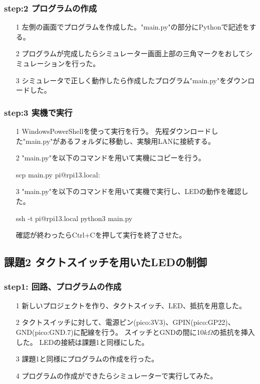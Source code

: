\documentclass[dvipdfmx]{jsarticle}
\begin{document}
\subsubsection{step:2 プログラムの作成}
\begin{itemize}
  \item[1] 左側の画面でプログラムを作成した。"main.py"の部分にPythonで記述をする。
  \item[2] プログラムが完成したらシミュレーター画面上部の三角マークをおしてシミュレーションを行った。
  \item[3] シミュレータで正しく動作したら作成したプログラム"main.py"をダウンロードした。
\end{itemize}

\subsubsection{step:3 実機で実行}
\begin{itemize}
  \item[1] WindowsPowerShellを使って実行を行う。
  先程ダウンロードした"main.py"があるフォルダに移動し、実験用LANに接続する。
  \item[2] "main.py"を以下のコマンドを用いて実機にコピーを行う。
  \begin{center}
    scp main.py pi@rpi13.local:
  \end{center}
  \item[3] "main.py"を以下のコマンドを用いて実機で実行し、LEDの動作を確認した。
  \begin{center}
    ssh -t pi@rpi13.local python3 main.py
  \end{center}
  確認が終わったらCtrl+Cを押して実行を終了させた。
\end{itemize}

\subsection{課題2 タクトスイッチを用いたLEDの制御}
\subsubsection{step1: 回路、プログラムの作成}
\begin{itemize}
  \item[1] 新しいプロジェクトを作り、タクトスイッチ、LED、抵抗を用意した。
  \item[2] タクトスイッチに対して、電源ピン(pico:3V3)、GPIN(pico:GP22)、GND(pico:GND.7)に配線を行う。
  スイッチとGNDの間に10$k\Omega$の抵抗を挿入した。
  LEDの接続は課題1と同様にした。
  \item[3] 課題1と同様にプログラムの作成を行った。
  \item[4] プログラムの作成ができたらシミュレーターで実行してみた。
\end{itemize}
\end{document}
